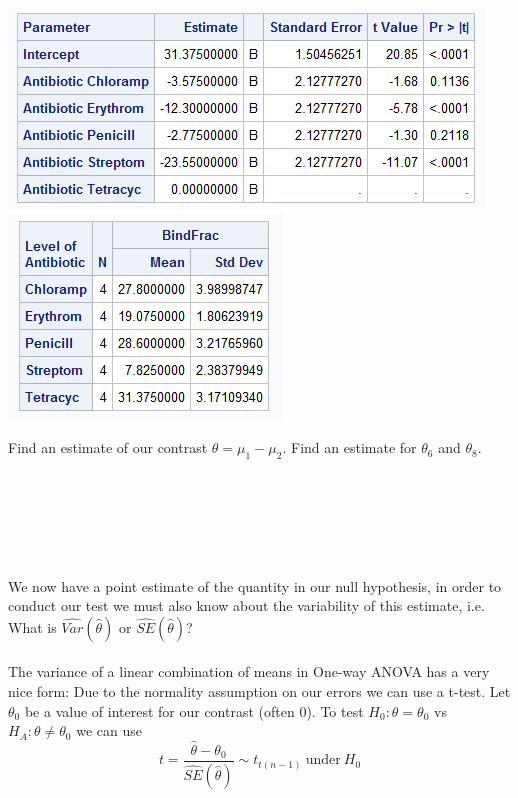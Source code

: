 \begin{center}
\includegraphics[scale=0.7]{BindFracSolution}\includegraphics[scale=0.7]{BindFracMeans}
\end{center}

\newpage

Find an estimate of our contrast $\theta=\mu_1-\mu_2$.  Find an estimate for $\theta_6$ and $\theta_8$.\\~\\~\\~\\~\\~\\~\\
We now have a point estimate of the quantity in our null hypothesis, in order to conduct our test we must also know about the variability of this estimate, i.e. What is $\hat{Var}(\hat{\theta})$ or $\hat{SE}(\hat{\theta})$?\\~\\
The variance of a linear combination of means in One-way ANOVA has a very nice form:
\color{black}
Due to the normality assumption on our errors we can use a t-test.  Let $\theta_0$ be a value of interest for our contrast (often 0).  To test $H_{0}:\theta=\theta_{0}$ vs $H_{A}:\theta\neq \theta_{0}$ we can use
        $$t=\frac{\hat{\theta}-\theta_{0}}{\hat{SE}(\hat{\theta})}\sim t_{t(n-1)}~\text{under}~H_{0}$$

